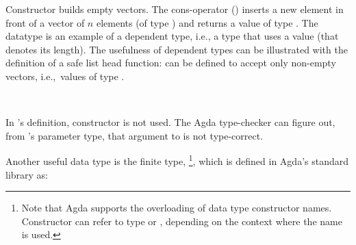 \documentclass[sigconf]{acmart}
\begin{document}
Constructor \AgdaInductiveConstructor{[]} builds empty vectors. The cons-operator ()
inserts a new element in front of a vector of $n$ elements (of type
) and returns a value of type . The
 datatype is an example of a dependent type, i.e., a type
that uses a value (that denotes its length). The usefulness of
dependent types can be illustrated with the definition of a safe list
head function:  can be defined to accept only non-empty
vectors, i.e.,~values of type .
\begin{code}%
%
\>[2]\AgdaSpace{}%
\AgdaSymbol{:}\AgdaSpace{}%
\AgdaSpace{}%
\AgdaSymbol{\{}\AgdaSpace{}%
\AgdaSymbol{\}}\AgdaSpace{}%
\AgdaSpace{}%
\AgdaSpace{}%
\AgdaSpace{}%
\AgdaSymbol{(}\AgdaSpace{}%
\AgdaSymbol{)}\AgdaSpace{}%
\AgdaSpace{}%
\<%
\\
%
\>[2]\AgdaSpace{}%
\AgdaSymbol{(}\AgdaSpace{}%
\AgdaSpace{}%
\AgdaSymbol{)}\AgdaSpace{}%
\AgdaSymbol{=}\AgdaSpace{}%
\<%
\end{code}
In 's definition, constructor \AgdaInductiveConstructor{[]} is not used. The
Agda type-checker can figure out, from 's parameter type,
that argument \AgdaInductiveConstructor{[]} to  is not type-correct.

Another useful data type is the finite type, \footnote{Note that Agda supports the overloading of data type constructor names.
Constructor  can refer to type  or , depending on the
context where the name is used.}, which is defined in
Agda's standard library as:
\end{document}
